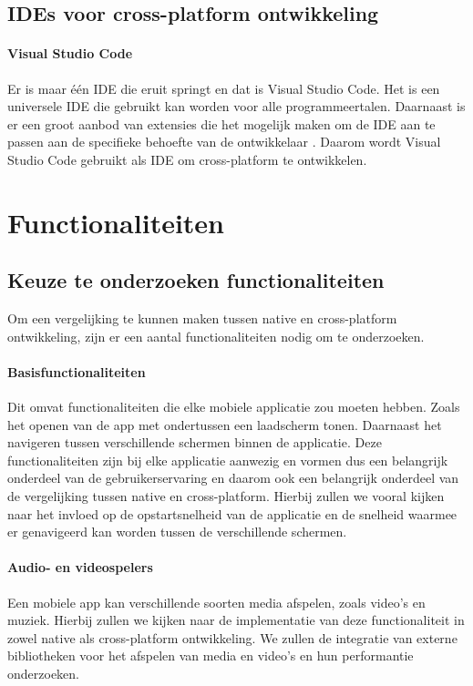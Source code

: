 \subsection{IDEs voor cross-platform ontwikkeling}
\paragraph{Visual Studio Code}
Er is maar één IDE die eruit springt en dat is Visual Studio Code. Het is een 
universele IDE die gebruikt kan worden voor alle programmeertalen. Daarnaast is er een 
groot aanbod van extensies die het mogelijk maken om de IDE aan te passen aan de 
specifieke behoefte van de ontwikkelaar \autocite{Heller2022}. Daarom wordt Visual 
Studio Code gebruikt als IDE om cross-platform te ontwikkelen.

\section{Functionaliteiten}
\subsection{Keuze te onderzoeken functionaliteiten}
Om een vergelijking te kunnen maken tussen native en cross-platform ontwikkeling, 
zijn er een aantal functionaliteiten nodig om te onderzoeken. 

\paragraph{Basisfunctionaliteiten}
Dit omvat functionaliteiten die elke mobiele applicatie zou moeten hebben. Zoals 
het openen van de app met ondertussen een laadscherm tonen. Daarnaast het navigeren 
tussen verschillende schermen binnen de applicatie. Deze functionaliteiten zijn bij 
elke applicatie aanwezig en vormen dus een belangrijk onderdeel van de gebruikerservaring 
en daarom ook een belangrijk onderdeel van de vergelijking tussen native en cross-platform.
Hierbij zullen we vooral kijken naar het invloed op de opstartsnelheid van de applicatie 
en de snelheid waarmee er genavigeerd kan worden tussen de verschillende schermen.

\paragraph{Audio- en videospelers}
Een mobiele app kan verschillende soorten media afspelen, zoals video's en muziek. 
Hierbij zullen we kijken naar de implementatie van deze functionaliteit in 
zowel native als cross-platform ontwikkeling. We zullen de integratie van externe bibliotheken 
voor het afspelen van media en video's en hun performantie onderzoeken.

